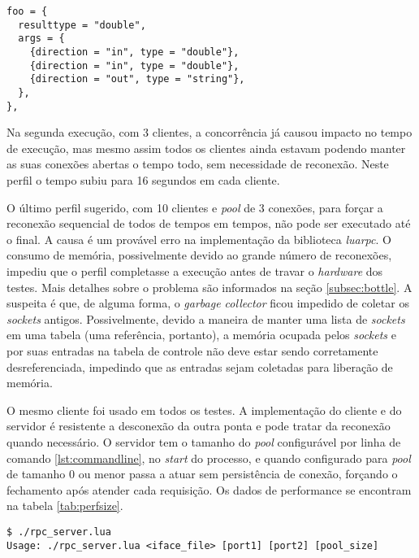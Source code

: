 \documentclass[11pt]{article}
\begin{document}
\begin{lstlisting}[caption={Interface foo},label={lst:ifacefoo}]
foo = {
  resulttype = "double",
  args = {
    {direction = "in", type = "double"},
    {direction = "in", type = "double"},
    {direction = "out", type = "string"},
  },
},
\end{lstlisting}

Na segunda execução, com 3 clientes, a concorrência já causou impacto no tempo
de execução, mas mesmo assim todos os clientes ainda estavam podendo manter as
suas conexões abertas o tempo todo, sem necessidade de reconexão. Neste perfil o
tempo subiu para 16 segundos em cada cliente.

O último perfil sugerido, com 10 clientes e \textit{pool} de 3 conexões, para
forçar a reconexão sequencial de todos de tempos em tempos, não pode ser
executado até o final. A causa é um provável erro na implementação da biblioteca
\textit{luarpc}. O consumo de memória, possivelmente devido ao grande número de
reconexões, impediu que o perfil completasse a execução antes de travar o
\textit{hardware} dos testes. Mais detalhes sobre o problema são informados na
seção \ref{subsec:bottle}. A suspeita é que, de alguma forma, o \textit{garbage
collector} ficou impedido de coletar os \textit{sockets} antigos. Possivelmente,
devido a maneira de manter uma lista de \textit{sockets} em uma tabela (uma
referência, portanto), a memória ocupada pelos \textit{sockets} e por suas
entradas na tabela de controle não deve estar sendo corretamente
desreferenciada, impedindo que as entradas sejam coletadas para liberação de
memória.

O mesmo cliente foi usado em todos os testes. A implementação do cliente e do
servidor é resistente a desconexão da outra ponta e pode tratar da reconexão
quando necessário. O servidor tem o tamanho do \textit{pool} configurável por
linha de comando \ref{lst:commandline}, no \textit{start} do processo, e quando
configurado para \textit{pool} de tamanho 0 ou menor passa a atuar sem
persistência de conexão, forçando o fechamento após atender cada requisição. Os
dados de performance se encontram na tabela \ref{tab:perfsize}.

\begin{lstlisting}[caption={Linha de comando},label={lst:commandline}]
$ ./rpc_server.lua
Usage: ./rpc_server.lua <iface_file> [port1] [port2] [pool_size]
\end{lstlisting}
\end{document}
